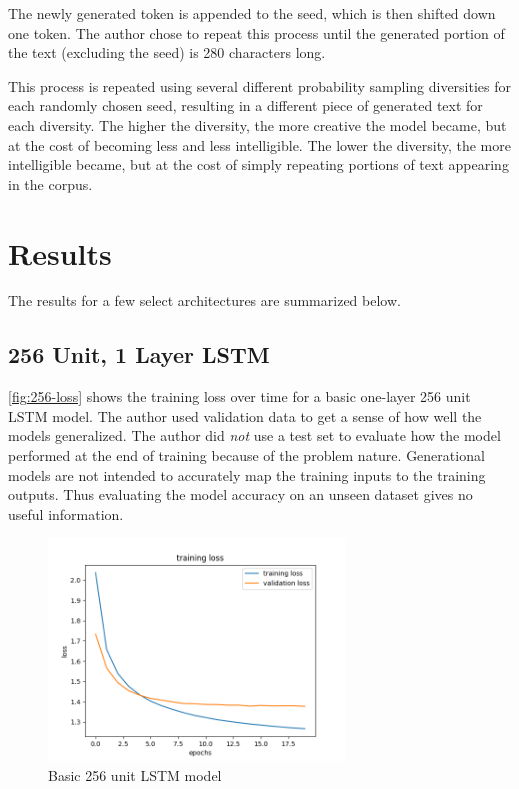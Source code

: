 \documentclass[letterpaper]{article}
\begin{document}
        The newly generated token is appended to the seed, which is then shifted down one token. The author chose to repeat this process until the generated portion of the text (excluding the seed) is 280 characters long.

        This process is repeated using several different probability sampling diversities for each randomly chosen seed, resulting in a different piece of generated text for each diversity. The higher the diversity, the more creative the model became, but at the cost of becoming less and less intelligible. The lower the diversity, the more intelligible became, but at the cost of simply repeating portions of text appearing in the corpus.

\section{Results}
    The results for a few select architectures are summarized below.

    \subsection{256 Unit, 1 Layer LSTM}
        \autoref{fig:256-loss} shows the training loss over time for a basic one-layer 256 unit LSTM model. The author used validation data to get a sense of how well the models generalized. The author did \textit{not} use a test set to evaluate how the model performed at the end of training because of the problem nature. Generational models are not intended to accurately map the training inputs to the training outputs. Thus evaluating the model accuracy on an unseen dataset gives no useful information.

        \begin{figure}[h]
            \centering
            \includegraphics[width=0.7\textwidth]{figures/256dropout20.png}
            \caption{Basic 256 unit LSTM model}\label{fig:256-loss}
        \end{figure}
\end{document}
